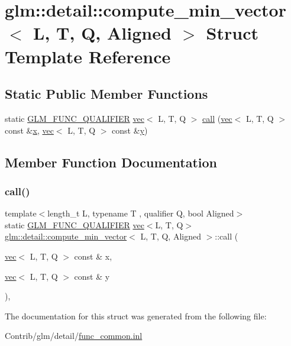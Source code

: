 \hypertarget{structglm_1_1detail_1_1compute__min__vector}{}\section{glm\+:\+:detail\+:\+:compute\+\_\+min\+\_\+vector$<$ L, T, Q, Aligned $>$ Struct Template Reference}
\label{structglm_1_1detail_1_1compute__min__vector}
\subsection*{Static Public Member Functions}
\begin{DoxyCompactItemize}
\item 
static \mbox{\hyperlink{setup_8hpp_a33fdea6f91c5f834105f7415e2a64407}{G\+L\+M\+\_\+\+F\+U\+N\+C\+\_\+\+Q\+U\+A\+L\+I\+F\+I\+ER}} \mbox{\hyperlink{structglm_1_1vec}{vec}}$<$ L, T, Q $>$ \mbox{\hyperlink{structglm_1_1detail_1_1compute__min__vector_ad55330fa32297063433503856406fb00}{call}} (\mbox{\hyperlink{structglm_1_1vec}{vec}}$<$ L, T, Q $>$ const \&\mbox{\hyperlink{_s_d_l__opengl_8h_ad0e63d0edcdbd3d79554076bf309fd47}{x}}, \mbox{\hyperlink{structglm_1_1vec}{vec}}$<$ L, T, Q $>$ const \&\mbox{\hyperlink{_s_d_l__opengl_8h_a1675d9d7bb68e1657ff028643b4037e3}{y}})
\end{DoxyCompactItemize}


\subsection{Member Function Documentation}
\mbox{\label{structglm_1_1detail_1_1compute__min__vector_ad55330fa32297063433503856406fb00}} 
\subsubsection{\texorpdfstring{call()}{call()}}
{\footnotesize\ttfamily template$<$length\+\_\+t L, typename T , qualifier Q, bool Aligned$>$ \\
static \mbox{\hyperlink{setup_8hpp_a33fdea6f91c5f834105f7415e2a64407}{G\+L\+M\+\_\+\+F\+U\+N\+C\+\_\+\+Q\+U\+A\+L\+I\+F\+I\+ER}} \mbox{\hyperlink{structglm_1_1vec}{vec}}$<$L, T, Q$>$ \mbox{\hyperlink{structglm_1_1detail_1_1compute__min__vector}{glm\+::detail\+::compute\+\_\+min\+\_\+vector}}$<$ L, T, Q, Aligned $>$\+::call (\begin{DoxyParamCaption}\item[{\mbox{\hyperlink{structglm_1_1vec}{vec}}$<$ L, T, Q $>$ const \&}]{x,  }\item[{\mbox{\hyperlink{structglm_1_1vec}{vec}}$<$ L, T, Q $>$ const \&}]{y }\end{DoxyParamCaption})\hspace{0.3cm}{\ttfamily [inline]}, {\ttfamily [static]}}



The documentation for this struct was generated from the following file\+:\begin{DoxyCompactItemize}
\item 
Contrib/glm/detail/\mbox{\hyperlink{func__common_8inl}{func\+\_\+common.\+inl}}\end{DoxyCompactItemize}
